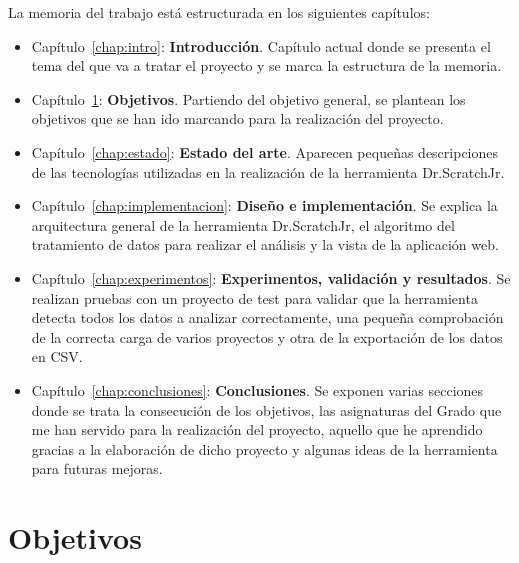 \documentclass[a4paper, 12pt]{book}
\begin{document}
La memoria del trabajo está estructurada en los siguientes capítulos:

\begin{itemize}
    \item Capítulo~\ref{chap:intro}: \textbf{Introducción}.
    Capítulo actual donde se presenta el tema del que va a tratar el proyecto y se marca la estructura de la memoria.
    \item Capítulo~\ref{chap:objetivos}: \textbf{Objetivos}. 
    Partiendo del objetivo general, se plantean los objetivos que se han ido marcando para la realización del proyecto.
    \item Capítulo~\ref{chap:estado}: \textbf{Estado del arte}. 
    Aparecen pequeñas descripciones de las tecnologías utilizadas en la realización de la herramienta Dr.ScratchJr.
    \item Capítulo~\ref{chap:implementacion}: \textbf{Diseño e implementación}. 
    Se explica la arquitectura general de la herramienta Dr.ScratchJr, el algoritmo del tratamiento de datos para realizar el análisis y la vista de la aplicación web.
    \item Capítulo~\ref{chap:experimentos}: \textbf{Experimentos, validación y resultados}. 
    Se realizan pruebas con un proyecto de test para validar que la herramienta detecta todos los datos a analizar correctamente, una pequeña comprobación de la correcta carga de varios proyectos y otra de la exportación de los datos en CSV.
    \item Capítulo~\ref{chap:conclusiones}: \textbf{Conclusiones}. 
    Se exponen varias secciones donde se trata la consecución de los objetivos, las asignaturas del Grado que me han servido para la realización del proyecto, aquello que he aprendido gracias a la elaboración de dicho proyecto y algunas ideas de la herramienta para futuras mejoras.
    
\end{itemize}




\cleardoublepage %
\chapter{Objetivos} %
\label{chap:objetivos} %
\end{document}
